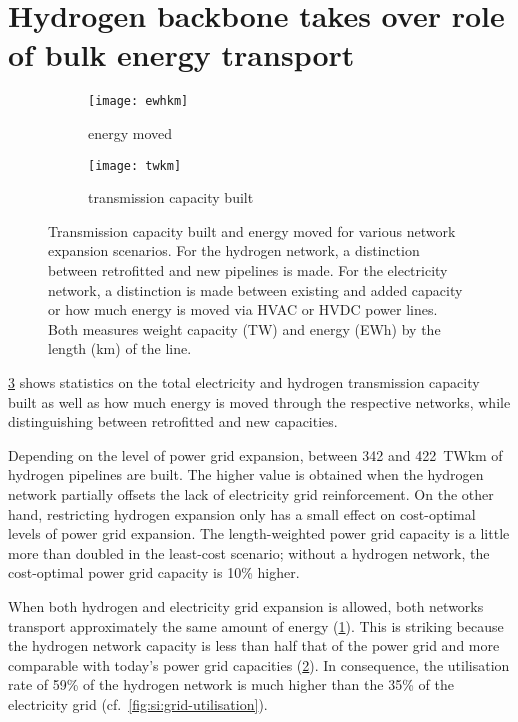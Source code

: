 \section*{Hydrogen backbone takes over role of bulk energy transport}
\label{sec:energy-moved}

\begin{figure}
    \centering
        \begin{subfigure}[t]{0.49\textwidth}
            \centering
            \caption{energy moved}
            \texttt{[image: ewhkm]}
            \label{fig:network-stats:ewhkm}
        \end{subfigure}
        \begin{subfigure}[t]{0.49\textwidth}
            \centering
            \caption{transmission capacity built}
            \texttt{[image: twkm]}
            \label{fig:network-stats:twkm}
        \end{subfigure}
    \caption{Transmission capacity built and energy moved for various network
        expansion scenarios. For the hydrogen network, a distinction between
        retrofitted and new pipelines is made. For the electricity network, a
        distinction is made between existing and added capacity or how much
        energy is moved via HVAC or HVDC power lines. Both measures weight
        capacity (TW) and energy (EWh) by the length (km) of the line.}
    \label{fig:network-stats}
\end{figure}

\cref{fig:network-stats} shows statistics on the total electricity and hydrogen
transmission capacity built as well as how much energy is moved through the
respective networks, while distinguishing between retrofitted and new
capacities.

Depending on the level of power grid expansion, between 342 and 422~TWkm of
hydrogen pipelines are built. The higher value is obtained when the hydrogen
network partially offsets the lack of electricity grid reinforcement. On the
other hand, restricting hydrogen expansion only has a small effect on
cost-optimal levels of power grid expansion. The length-weighted power grid
capacity is a little more than doubled in the least-cost scenario; without a
hydrogen network, the cost-optimal power grid capacity is 10\%
higher.

When both hydrogen and electricity grid expansion is allowed, both networks
transport approximately the same amount of energy
(\cref{fig:network-stats:ewhkm}). This is striking because the hydrogen network
capacity is less than half that of the power grid and more comparable with
today's power grid capacities (\cref{fig:network-stats:twkm}). In consequence,
the utilisation rate of 59\% of the hydrogen network is much higher than the 35\% of
the electricity grid (cf.~\cref{fig:si:grid-utilisation}).


